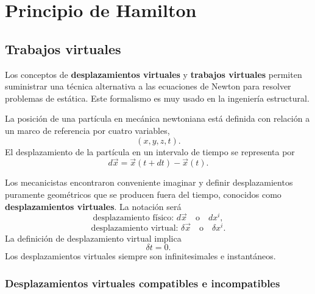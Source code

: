 \documentclass[../apunte_mecanica_clasica.tex]{subfiles}%
\begin{document}
\chapter{Principio de Hamilton}
\label{ch:principio-de-hamilton}

\section{Trabajos virtuales}
\label{sec:ph-trabajos-virtuales}

Los conceptos de \textbf{desplazamientos virtuales} y \textbf{trabajos virtuales} permiten suministrar una técnica alternativa a las ecuaciones de Newton para resolver problemas de estática. Este formalismo es muy usado en la ingeniería estructural.

La posición de una partícula en mecánica newtoniana está definida con relación a un marco de referencia por cuatro variables,
\begin{equation}
    (x,y,z,t).
    \label{eq:ph-variables-posicion-tiempo}
\end{equation}
El desplazamiento de la partícula en un intervalo de tiempo se representa por
\begin{equation}
    d\vec x=\vec x(t+dt)-\vec x(t).
    \label{eq:ph-desplazamiento-fisico}
\end{equation}

Los mecanicistas encontraron conveniente imaginar y definir desplazamientos puramente geométricos que se producen fuera del tiempo, conocidos como \textbf{desplazamientos virtuales}. La notación será
\begin{equation}
    \text{desplazamiento físico: } d\vec x \quad \text{o} \quad dx^i,
    \label{eq:ph-notacion-desplazamiento-fisico}
\end{equation}
\begin{equation}
    \text{desplazamiento virtual: } \delta \vec x \quad \text{o} \quad \delta x^i.
    \label{eq:ph-notacion-desplazamiento-virtual}
\end{equation}
La definición de desplazamiento virtual implica
\begin{equation}
    \delta t=0.
    \label{eq:ph-delta-t-cero}
\end{equation}
Los desplazamientos virtuales siempre son infinitesimales e instantáneos.

\subsection{Desplazamientos virtuales compatibles e incompatibles}
\label{subsec:ph-desplazamientos-compatibles}
\end{document}
